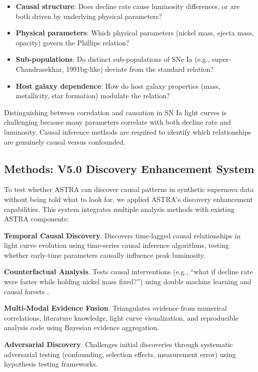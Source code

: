 \documentclass[usenatbib]{rasti}
\begin{document}
\begin{itemize}
\item \textbf{Causal structure}: Does decline rate cause luminosity differences, or are both driven by underlying physical parameters?
\item \textbf{Physical parameters}: Which physical parameters (nickel mass, ejecta mass, opacity) govern the Phillips relation?
\item \textbf{Sub-populations}: Do distinct sub-populations of SNe Ia (e.g., super-Chandrasekhar, 1991bg-like) deviate from the standard relation?
\item \textbf{Host galaxy dependence}: How do host galaxy properties (mass, metallicity, star formation) modulate the relation?
\end{itemize}

Distinguishing between correlation and causation in SN Ia light curves is challenging because many parameters correlate with both decline rate and luminosity. Causal inference methods are required to identify which relationships are genuinely causal versus confounded.

\subsection{Methods: V5.0 Discovery Enhancement System}

To test whether ASTRA can discover causal patterns in synthetic supernova data without being told what to look for, we applied ASTRA's discovery enhancement capabilities. This system integrates multiple analysis methods with existing ASTRA components:

\noindent\textbf{Temporal Causal Discovery}. Discovers time-lagged causal relationships in light curve evolution using time-series causal inference algorithms, testing whether early-time parameters causally influence peak luminosity.

\noindent\textbf{Counterfactual Analysis}. Tests causal interventions (e.g., ``what if decline rate were faster while holding nickel mass fixed?'') using double machine learning and causal forests \cite{chernozhukov2018}.

\noindent\textbf{Multi-Modal Evidence Fusion}. Triangulates evidence from numerical correlations, literature knowledge, light curve visualization, and reproducible analysis code using Bayesian evidence aggregation.

\noindent\textbf{Adversarial Discovery}. Challenges initial discoveries through systematic adversarial testing (confounding, selection effects, measurement error) using hypothesis testing frameworks.
\end{document}
